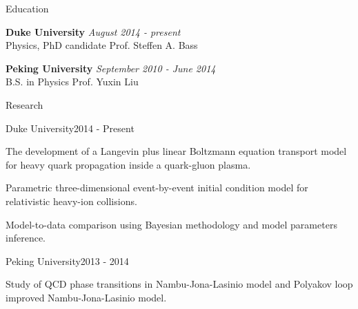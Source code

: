 \documentclass{resume} %
\begin{document}

\begin{rSection}{Education}

{\bf Duke University} \hfill {\em August 2014 - present} \\ 
Physics, PhD candidate \hfill Prof. Steffen A. Bass

{\bf Peking University} \hfill {\em September 2010 - June 2014} \\ 
B.S. in Physics \hfill Prof. Yuxin Liu

\end{rSection}


\begin{rSection}{Research}

\begin{rSubsection}{Duke University}{2014 - Present}{}{}
\item The development of a Langevin plus linear Boltzmann equation transport model for heavy quark propagation inside a quark-gluon plasma.
\item Parametric three-dimensional event-by-event initial condition model for relativistic heavy-ion collisions.
\item Model-to-data comparison using Bayesian methodology and model parameters inference.


\end{rSubsection}
\begin{rSubsection}{Peking University}{2013 - 2014}{}{}
\item Study of QCD phase transitions in Nambu-Jona-Lasinio model and Polyakov loop improved Nambu-Jona-Lasinio model.
\end{rSubsection}

\end{rSection}
\end{document}
